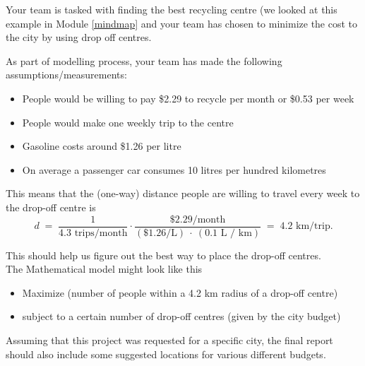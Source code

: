 \begin{example}
Your team is tasked with finding the best recycling centre (we looked at this example in Module \ref{mindmap} and your  team has chosen to minimize the cost to the city by using drop off centres.

As part of modelling process, your team has made the following assumptions/measurements:
\begin{itemize}
	\item People would be willing to pay \$2.29 to recycle per month or \$0.53 per week
	\item People would make one weekly trip to the centre
	\item Gasoline costs around \$1.26 per litre
	\item On average a passenger car consumes 10 litres per hundred kilometres\\
\end{itemize}

This means that the (one-way) distance people are willing to travel every week to the drop-off centre is
$$
d \;=\; \frac{1}{4.3 \text{ trips/month}} \cdot \frac{\$2.29 / {\text{month}} }{(\$1.26 \text{/L}) \ \cdot\  (0.1 \text{ L / km})} \;=\; 4.2 \text{  km/trip}.
$$

This should help us figure out the best way to place the drop-off centres. \\

The Mathematical model might look like this

\begin{itemize}
	\item Maximize (number of people within a 4.2 km radius of a drop-off centre)
	\item subject to a certain number of drop-off centres (given by the city budget) %
\end{itemize}

\end{example}

\begin{graybox}
Assuming that this project was requested for a specific city, the final report should also include some suggested locations for various different budgets.	
\end{graybox}


%



